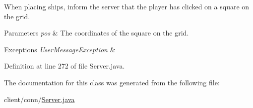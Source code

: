When placing ships, inform the server that the player has clicked on a square on the grid. 
\begin{DoxyParams}{Parameters}
{\em pos} & The coordinates of the square on the grid. \\
\hline
\end{DoxyParams}

\begin{DoxyExceptions}{Exceptions}
{\em User\+Message\+Exception} & \\
\hline
\end{DoxyExceptions}


Definition at line 272 of file Server.\+java.



The documentation for this class was generated from the following file\+:\begin{DoxyCompactItemize}
\item 
client/conn/\hyperlink{_server_8java}{Server.\+java}\end{DoxyCompactItemize}
